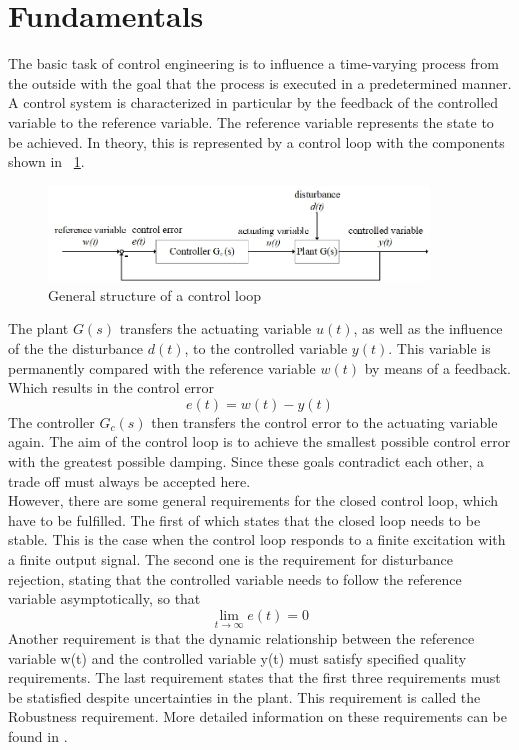 \section{Fundamentals}
The basic task of control engineering is to influence a time-varying process from the outside with the goal that the process is executed in a predetermined manner. A control system is characterized in particular by the feedback of the controlled variable to the reference variable. The reference variable represents the state to be achieved.
In theory, this is represented by a control loop with the components shown in \figurename~{\ref{fig:control_loop}}.
\begin{figure}
  \centering
  \includegraphics[width=0.9\textwidth]{images/control_loop.jpg}
  \caption[General structure of a control loop]{General structure of a control loop}
  \label{fig:control_loop}
\end{figure}
The plant $G(s)$ transfers the actuating variable $u(t)$, as well as the influence of the the disturbance $d(t)$, to the controlled variable $y(t)$. This variable is permanently compared with the reference variable $w(t)$ by means of a feedback. Which results in the control error
\begin{equation}
  e(t) = w(t) - y(t)
 \label{eq:e_t}
\end{equation}
The controller $G_{c}(s)$ then transfers the control error to the actuating variable again. The aim of the control loop is to achieve the smallest possible control error with the greatest possible damping. Since these goals contradict each other, a trade off must always be accepted here.\cite{Reg_17}
\\However, there are some general requirements for the closed control loop, which have to be fulfilled. The first of which states that the closed loop needs to be stable. This is the case when the control loop responds to a finite excitation with a finite output signal. The second one is the requirement for disturbance rejection, stating that the controlled variable needs to follow the reference variable asymptotically, so that
\begin{equation}
    \lim\limits_{t \rightarrow \infty}{e(t)} = 0
 \label{eq:lim_e}
\end{equation}
Another requirement is that the dynamic relationship between the reference variable w(t) and the controlled variable y(t) must satisfy specified quality requirements.  The last requirement states that the first three requirements must be statisfied despite uncertainties in the plant. This requirement is called the Robustness requirement. More detailed information on these requirements can be found in \cite{Reg_10}.

